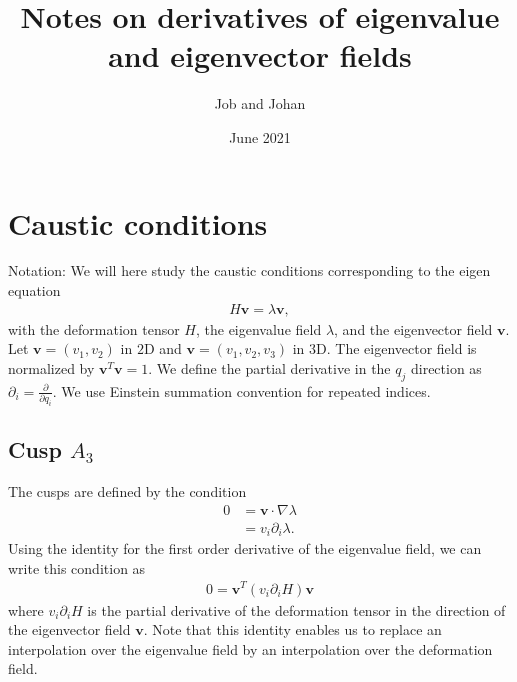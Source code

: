 \documentclass{article}
\title{Notes on derivatives of eigenvalue and eigenvector fields}
\author{Job and Johan}
\date{June 2021}
\begin{document}
\maketitle

\section{Caustic conditions}
Notation: We will here study the caustic conditions corresponding to the eigen equation
\begin{align}
H \bm{v} = \lambda \bm{v},
\end{align}
with the deformation tensor $H$, the eigenvalue field $\lambda$, and the eigenvector field $\bm{v}$. Let $\bm{v}=(v_1,v_2)$ in $2$D and $\bm{v}=(v_1,v_2,v_3)$ in $3$D. The eigenvector field is normalized by $\bm{v}^T\bm{v}=1$. We define the partial derivative in the $q_j$ direction as $\partial_i = \frac{\partial}{\partial q_i}$. We use Einstein summation convention for repeated indices. 

\subsection{Cusp $A_3$}
The cusps are defined by the condition
\begin{align}
0
&= \bm{v} \cdot \nabla \lambda\\
&= v_i \partial_i \lambda.
\end{align}
Using the identity for the first order derivative of the eigenvalue field, we can write this condition as
\begin{align}
0= \bm{v}^T  (v_i \partial_i H)\bm{v}
\end{align}
where $v_i \partial_i H$ is the partial derivative of the deformation tensor in the direction of the eigenvector field $\bm{v}$. Note that this identity enables us to replace an interpolation over the eigenvalue field by an interpolation over the deformation field.

\end{document}
